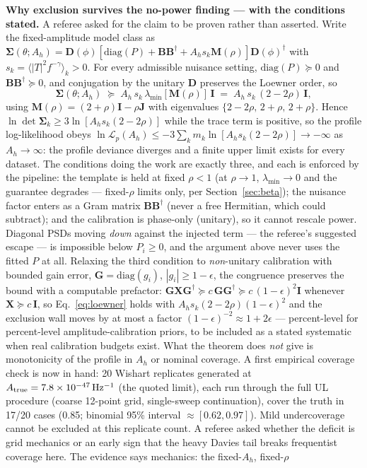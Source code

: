 \documentclass[11pt]{article}
\newcommand{\Ah}{A_h}
\begin{document}
\textbf{Why exclusion survives the no-power finding --- with the conditions stated.} A referee asked for the claim to be proven rather than asserted. Write the fixed-amplitude model class as $\bm{\Sigma}(\theta; \Ah) = \mathbf{D}(\phi)\left[\mathrm{diag}(P) + \mathbf{B}\mathbf{B}^\dagger + \Ah s_k \mathbf{M}(\rho)\right]\mathbf{D}(\phi)^\dagger$ with $s_k = \langle |T|^2 f^{-\gamma}\rangle_k > 0$. For every admissible nuisance setting, $\mathrm{diag}(P) \succeq 0$ and $\mathbf{B}\mathbf{B}^\dagger \succeq 0$, and conjugation by the unitary $\mathbf{D}$ preserves the Loewner order, so
\begin{equation}
\bm{\Sigma}(\theta; \Ah) \;\succeq\; \Ah\, s_k\, \lambda_{\min}[\mathbf{M}(\rho)]\, \mathbf{I}
\;=\; \Ah\, s_k\, (2 - 2\rho)\, \mathbf{I},
\label{eq:loewner}
\end{equation}
using $\mathbf{M}(\rho) = (2+\rho)\mathbf{I} - \rho\mathbf{J}$ with eigenvalues $\{2-2\rho,\, 2+\rho,\, 2+\rho\}$. Hence $\ln\det\bm{\Sigma}_k \ge 3\ln[\Ah s_k(2-2\rho)]$ while the trace term is positive, so the profile log-likelihood obeys $\ln\mathcal{L}_p(\Ah) \le -3\sum_k m_k \ln[\Ah s_k (2-2\rho)] \to -\infty$ as $\Ah \to \infty$: the profile deviance diverges and a finite upper limit exists for every dataset. The conditions doing the work are exactly three, and each is enforced by the pipeline: the template is held at fixed $\rho < 1$ (at $\rho \to 1$, $\lambda_{\min} \to 0$ and the guarantee degrades --- fixed-$\rho$ limits only, per Section~\ref{sec:beta}); the nuisance factor enters as a Gram matrix $\mathbf{B}\mathbf{B}^\dagger$ (never a free Hermitian, which could subtract); and the calibration is phase-only (unitary), so it cannot rescale power. Diagonal PSDs moving \emph{down} against the injected term --- the referee's suggested escape --- is impossible below $P_i \ge 0$, and the argument above never uses the fitted $P$ at all. Relaxing the third condition to \emph{non}-unitary calibration with bounded gain error, $\mathbf{G} = \mathrm{diag}(g_i)$, $|g_i| \ge 1 - \epsilon$, the congruence preserves the bound with a computable prefactor: $\mathbf{G}\mathbf{X}\mathbf{G}^\dagger \succeq c\,\mathbf{G}\mathbf{G}^\dagger \succeq c\,(1-\epsilon)^2\mathbf{I}$ whenever $\mathbf{X} \succeq c\,\mathbf{I}$, so Eq.~\eqref{eq:loewner} holds with $\Ah s_k (2-2\rho)(1-\epsilon)^2$ and the exclusion wall moves by at most a factor $(1-\epsilon)^{-2} \approx 1 + 2\epsilon$ --- percent-level for percent-level amplitude-calibration priors, to be included as a stated systematic when real calibration budgets exist. What the theorem does \emph{not} give is monotonicity of the profile in $\Ah$ or nominal coverage. A first empirical coverage check is now in hand: 20 Wishart replicates generated at $A_{\rm true} = 7.8\times10^{-47}\,\mathrm{Hz^{-1}}$ (the quoted limit), each run through the full UL procedure (coarse 12-point grid, single-sweep continuation), cover the truth in 17/20 cases (0.85; binomial 95\% interval $\approx[0.62, 0.97]$). Mild undercoverage cannot be excluded at this replicate count. A referee asked whether the deficit is grid mechanics or an early sign that the heavy Davies tail breaks frequentist coverage here. The evidence says mechanics: the fixed-$\Ah$, fixed-$\rho$ 
\end{document}
